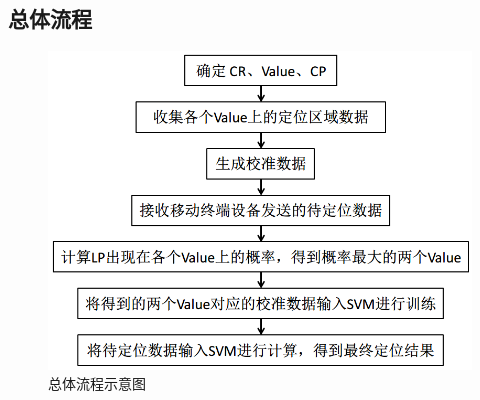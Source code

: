 \documentclass[a4paper, UTF8]{ctexart}
\begin{document}
\subsection{总体流程}
\begin{figure}[!ht]\centering
  \includegraphics[keepaspectratio, scale=0.5]{no11.png}
  \caption{总体流程示意图\label{fig:no11}} 
\end{figure}
\end{document}
